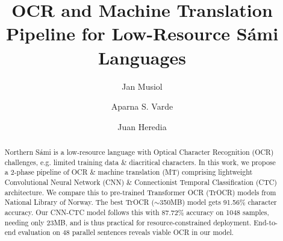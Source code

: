 \documentclass[runningheads]{llncs}
\newcommand{\ctcCER}{12.24}      %
\newcommand{\ctcCacc}{87.72}
\newcommand{\trocrBestCER}{8.55}     %
\newcommand{\trocrBestCacc}{91.56}
\newcommand{\modelSize}{23MB}
\newcommand{\benchmarkSamples}{1048}  %
\newcommand{\bookTestSamples}{48}    %
\begin{document}
%
\title{OCR and Machine Translation Pipeline for Low-Resource S\'{a}mi Languages}
%
%
\vspace{-0.9cm}
\author{Jan Musiol \and
Aparna S. Varde \and
Juan Heredia}
%

\maketitle

\vspace{-0.7cm}
%
\begin{abstract}
Northern S\'{a}mi is a low-resource language with Optical Character Recognition (OCR) challenges, e.g. limited training data \& diacritical characters.
In this work, we propose a 2-phase pipeline of OCR \& machine translation (MT) comprising lightweight Convolutional Neural Network (CNN) \& Connectionist Temporal Classification (CTC) architecture. We compare this to pre-trained Transformer OCR (TrOCR) models from National Library of Norway.
The best TrOCR ($\sim$350MB) model gets \trocrBestCacc\% character accuracy. Our CNN-CTC model follows this with \ctcCacc\% accuracy on \benchmarkSamples{} samples, needing only \modelSize{}, and is thus practical for resource-constrained deployment. %
End-to-end evaluation on \bookTestSamples{} parallel sentences reveals viable OCR in our model. %
\vspace{-0.2cm}

\end{abstract}
%
\vspace{-1cm}
\end{document}
